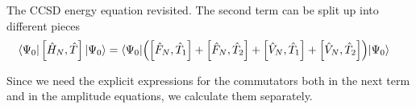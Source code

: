 \begin{frame}{The CCSD energy equation revisited.}
     The second term can be split up into different pieces
    \small
        \begin{align*}
        \langle\Psi_0|\left[ \hat{H}_N, \hat{T} \right]|\Psi_0\rangle & = 
            \langle\Psi_0| \Bigl(\left[ \hat{F}_N, \hat{T}_1 \right] + \left[ \hat{F}_N, \hat{T}_2 \right]
            + \left[ \hat{V}_N, \hat{T}_1 \right] + \left[ \hat{V}_N, \hat{T}_2 \right] \Bigr) |\Psi_0\rangle
    \end{align*}

    \begin{block}{}
    Since we need the explicit expressions for the commutators both in the next term and in the amplitude equations, we calculate them separately.
    \end{block}

\end{frame}

    
